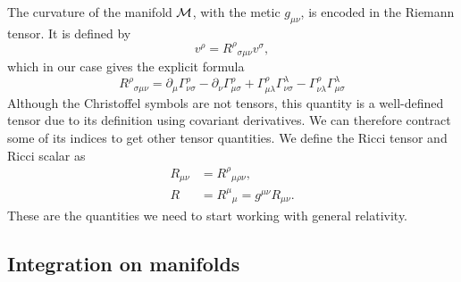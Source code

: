 The curvature of the manifold $\mathcal{M}$, with the metic $g_{\mu \nu}$, is encoded in the Riemann tensor.
It is defined by
%
\begin{equation}
    [\nabla_\mu, \nabla_\nu] v^\rho = R^{\rho}{}_{\sigma \mu \nu} v^\sigma,
\end{equation}
%
which in our case gives the explicit formula
%
\begin{equation}
    \label{riemann tensor in terms of christoffel symbols}
    R^\rho{}_{\sigma \mu \nu} 
    = \partial_{\mu} \Gamma^{\rho}_{\nu \sigma}
    - \partial_{\nu} \Gamma^{\rho}_{\mu \sigma}
    + \Gamma^{\rho}_{\mu \lambda} \Gamma^{\lambda}_{\nu \sigma}  
    - \Gamma^{\rho}_{\nu \lambda} \Gamma^{\lambda}_{\mu \sigma} 
\end{equation}
%
Although the Christoffel symbols are not tensors, this quantity is a well-defined tensor due to its definition using covariant derivatives.
We can therefore contract some of its indices to get other tensor quantities.
We  define the Ricci tensor and Ricci scalar as
%
\begin{align}
    \label{Ricci tensor}
    R_{\mu \nu} &= R^{\rho}{}_{\mu \rho \nu}, \\
    \label{Ricci scalar}
    R &= R^{\mu}{}_{\mu} = g^{\mu \nu} R_{\mu \nu}.
\end{align}
%
These are the quantities we need to start working with general relativity.

\subsection*{Integration on manifolds}

